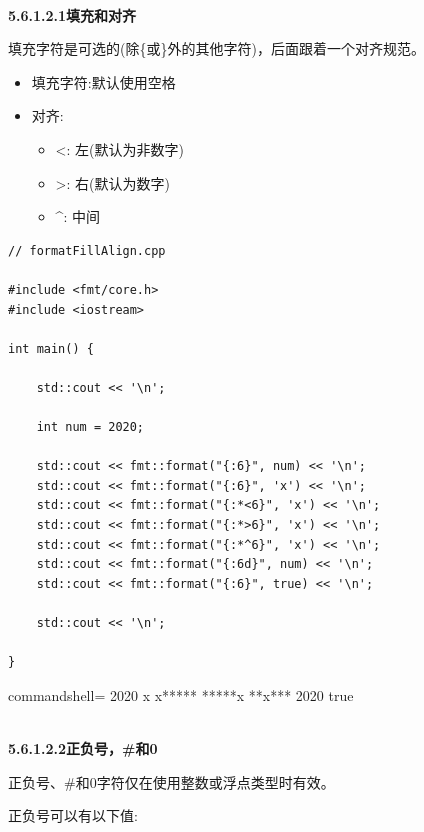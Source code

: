 \hspace*{\fill} \\ %
\noindent
\textbf{5.6.1.2.1\hspace{0.2cm}填充和对齐}

填充字符是可选的(除\{或\}外的其他字符)，后面跟着一个对齐规范。

\begin{itemize}
\item 
填充字符:默认使用空格

\item 
对齐:
\begin{itemize}
\item 
<: 左(默认为非数字)

\item 
>: 右(默认为数字)

\item 
\^{}: 中间
\end{itemize}
\end{itemize}

\begin{lstlisting}[style=styleCXX]
// formatFillAlign.cpp

#include <fmt/core.h>
#include <iostream>

int main() {
	
	std::cout << '\n';
	
	int num = 2020;
	
	std::cout << fmt::format("{:6}", num) << '\n';
	std::cout << fmt::format("{:6}", 'x') << '\n';
	std::cout << fmt::format("{:*<6}", 'x') << '\n';
	std::cout << fmt::format("{:*>6}", 'x') << '\n';
	std::cout << fmt::format("{:*^6}", 'x') << '\n';
	std::cout << fmt::format("{:6d}", num) << '\n';
	std::cout << fmt::format("{:6}", true) << '\n';
	
	std::cout << '\n';
	
}
\end{lstlisting}

\begin{tcblisting}{commandshell={}}
  2020
x
x*****
*****x
**x***
  2020
true
\end{tcblisting}


\hspace*{\fill} \\ %
\noindent
\textbf{5.6.1.2.2\hspace{0.2cm}正负号，\#和0}

正负号、\#和0字符仅在使用整数或浮点类型时有效。

正负号可以有以下值:

